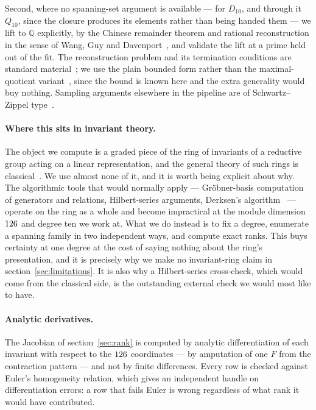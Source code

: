 \documentclass[11pt,a4paper]{article}
\theoremstyle{definition}
\theoremstyle{remark}
\newcommand{\Dten}{D_{10}}
\newcommand{\Qten}{Q_{10}}
\newcommand{\Q}{\mathbb{Q}}
\begin{document}
Second, where no spanning-set argument is available --- for
$\Dten$, and through it $\Qten$, since the closure produces its elements rather
than being handed them --- we lift to $\Q$ explicitly, by the
Chinese remainder theorem and rational reconstruction in the sense of Wang, Guy
and Davenport~\cite{Wang:1982}, and validate the lift at a prime held out of the
fit. The reconstruction problem and its termination conditions are standard
material~\cite{vzGathen:2013,Cohen:1993}; we use the plain bounded form rather
than the maximal-quotient variant~\cite{Monagan:2004}, since the bound is known
here and the extra generality would buy nothing. Sampling arguments elsewhere in
the pipeline are of Schwartz--Zippel type~\cite{Zippel:1979,Schwartz:1980}.

\paragraph{Where this sits in invariant theory.}
The object we compute is a graded piece of the ring of invariants of a
reductive group acting on a linear representation, and the general theory of
such rings is classical~\cite{Weyl:1946,Popov:1994}. We use almost none of it,
and it is worth being explicit about why. The algorithmic tools that would
normally apply --- Gr\"obner-basis computation of generators and relations,
Hilbert-series arguments, Derksen's algorithm~\cite{Derksen:2002,Sturmfels:2008}
--- operate on the ring as a whole and become impractical at the module
dimension $126$ and degree ten we work at. What we do instead is
to fix a degree, enumerate a spanning family in two independent ways, and
compute exact ranks. This buys certainty at one degree at the cost of saying
nothing about the ring's presentation, and it is precisely why we make no
invariant-ring claim in section~\ref{sec:limitations}. It is also why a
Hilbert-series cross-check, which would come from the classical side, is the
outstanding external check we would most like to have.

\paragraph{Analytic derivatives.}
The Jacobian of section~\ref{sec:rank} is computed by analytic differentiation of
each invariant with respect to the $126$ coordinates --- by
amputation of one $F$ from the contraction pattern --- and not by finite
differences. Every row is checked against Euler's homogeneity relation, which
gives an independent handle on differentiation errors: a row that fails Euler is
wrong regardless of what rank it would have contributed.
\end{document}
